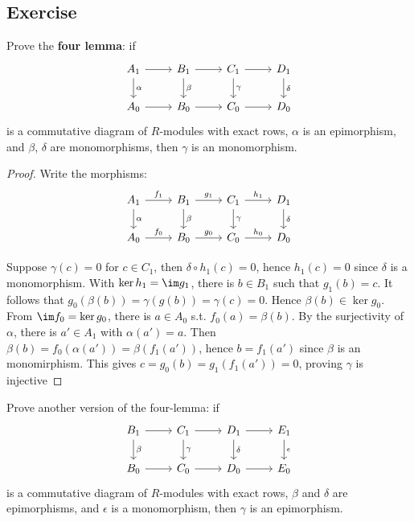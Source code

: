\subsection{Exercise}
\begin{exercise}
Prove the \textbf{four lemma}: if
\[\begin{tikzcd}
A_1\ar[r]\ar[d,"\alpha"]&B_1\ar[d,"\beta"]\ar[r]&C_1\ar[d,"\gamma"]\ar[r]&D_1\ar[d,"\delta"]\\
A_0\ar[r]&B_0\ar[r]&C_0\ar[r]&D_0
\end{tikzcd}\]
is a commutative diagram of $R$-modules with exact rows, $\alpha$ is an epimorphism, and
$\beta$, $\delta$ are monomorphisms, then $\gamma$ is an monomorphism.
\end{exercise}
\begin{proof}
Write the morphisms:
\[\begin{tikzcd}
A_1\ar[r,"f_1"]\ar[d,"\alpha"]&B_1\ar[d,"\beta"]\ar[r,"g_1"]&C_1\ar[d,"\gamma"]\ar[r,"h_1"]&D_1\ar[d,"\delta"]\\
A_0\ar[r,"f_0"]&B_0\ar[r,"g_0"]&C_0\ar[r,"h_0"]&D_0
\end{tikzcd}\]
\item Suppose $\gamma(c)=0$ for $c\in C_1$, then $\delta\circ h_1(c)=0$, hence $h_1(c)=0$ since $\delta$ is a monomorphism. With $\ker h_1=\im g_1$, there is $b\in B_1$ such that $g_1(b)=c$. It follows that $g_0(\beta(b))=\gamma(g(b))=\gamma(c)=0$. Hence $\beta(b)\in\ker g_0$. From $\im f_0=\ker g_0$, there is $a\in A_0$ s.t. $f_0(a)=\beta(b)$. By the surjectivity of $\alpha$, there is $a'\in A_1$ with $\alpha(a')=a$. Then $\beta(b)=f_0(\alpha(a'))=\beta(f_1(a'))$, hence $b=f_1(a')$ since $\beta$ is an monomirphism. This gives $c=g_0(b)=g_1(f_1(a'))=0$, proving $\gamma$ is injective\par
\end{proof}
\begin{exercise}
Prove another version of the four-lemma: if
\[\begin{tikzcd}
B_1\ar[r]\ar[d,"\beta"]&C_1\ar[r]\ar[d,"\gamma"]&D_1\ar[r]\ar[d,"\delta"]&E_1\ar[d,"\epsilon"]\\
B_0\ar[r]&C_0\ar[r]&D_0\ar[r]&E_0
\end{tikzcd}\]
is a commutative diagram of $R$-modules with exact rows, $\beta$ and $\delta$ are epimorphisms, and $\epsilon$ is a monomorphism, then $\gamma$ is an epimorphism.
\end{exercise}
